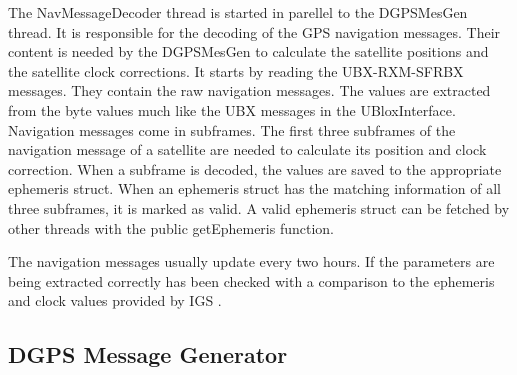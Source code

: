 The NavMessageDecoder thread is started in parellel to the DGPSMesGen thread.
It is responsible for the decoding of the GPS navigation messages.
Their content is needed by the DGPSMesGen to calculate the satellite positions and the satellite clock corrections.
It starts by reading the UBX-RXM-SFRBX messages.
They contain the raw navigation messages.
The values are extracted from the byte values much like the UBX messages in the UBloxInterface.
Navigation messages come in subframes.
The first three subframes of the navigation message of a satellite are needed to calculate its position and clock correction.
When a subframe is decoded, the values are saved to the appropriate ephemeris struct.
When an ephemeris struct has the matching information of all three subframes, it is marked as valid.
A valid ephemeris struct can be fetched by other threads with the public getEphemeris function.

The navigation messages usually update every two hours.
If the parameters are being extracted correctly has been checked with a comparison to the ephemeris and clock values provided by IGS \cite{IGS}.

\subsection{DGPS Message Generator}

